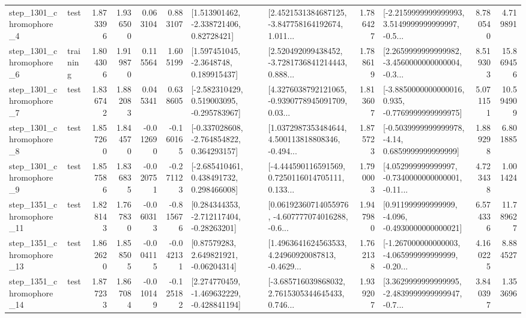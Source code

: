 \begin{tabular}{llrrrrllrlrr}
  step\_1301\_chromophore\_4 &      test &      1.873396 &    1.936500 &      0.063104 &  0.883107 &     [1.513901462, -2.338721406, 0.82728421] &  [2.4521531384687125, -3.847758164192674, 1.011... &       1.786427 &  [-2.2159999999999993, 3.5149999999999997, -0.5... &            8.780540 &          4.719891 \\
  step\_1301\_chromophore\_6 &  training &      1.804306 &    1.919870 &      0.115564 &  1.605199 &      [1.597451045, -2.3648748, 0.189915437] &  [2.520492099438452, -3.7281736841214443, 0.888... &       1.788619 &  [2.2659999999999982, -3.4560000000000004, -0.3... &            8.519303 &         15.869456 \\
  step\_1301\_chromophore\_7 &      test &      1.836742 &    1.882083 &      0.045341 &  0.638605 &   [-2.582310429, 0.519003095, -0.295783967] &  [4.3276038792121065, -0.9390778945091709, 0.03... &       1.813607 &  [-3.8850000000000016, 0.935, -0.7769999999999975] &            5.071151 &         10.594909 \\
  step\_1301\_chromophore\_8 &      test &      1.857260 &    1.844570 &     -0.012690 & -0.160165 &   [-0.337028608, -2.764854822, 0.364293157] &  [1.0372987353484644, 4.500113818808346, -0.494... &       1.875723 &   [-0.5039999999999978, -4.14, 0.6859999999999999] &            1.889298 &          6.801885 \\
  step\_1301\_chromophore\_9 &      test &      1.857586 &    1.836835 &     -0.020751 & -0.271123 &    [-2.685410461, 0.438491732, 0.298466008] &  [-4.444590116591569, 0.7250116014705111, 0.133... &       1.790003 &  [4.052999999999997, -0.7340000000000001, -0.11... &            4.723438 &          1.001424 \\
 step\_1351\_chromophore\_11 &      test &      1.828143 &    1.767830 &     -0.060313 & -0.815676 &    [0.284344353, -2.712117404, -0.28263201] &  [0.06192360714055976, -4.607777074016288, -0.6... &       1.947980 &   [0.911999999999999, -4.096, -0.4930000000000021] &            6.574336 &         11.789627 \\
 step\_1351\_chromophore\_13 &      test &      1.862620 &    1.858505 &     -0.004115 & -0.042131 &      [0.87579283, 2.649821921, -0.06204314] &  [1.4963641624563533, 4.24960920087813, -0.4629... &       1.762138 &  [-1.267000000000003, -4.065999999999999, -0.20... &            4.160225 &          8.884527 \\
 step\_1351\_chromophore\_14 &      test &      1.877233 &    1.867084 &     -0.010149 & -0.125182 &   [2.274770459, -1.469632229, -0.428841194] &  [-3.685716039868032, 2.7615305344645433, 0.746... &       1.939207 &  [3.3629999999999995, -2.4839999999999947, -0.7... &            3.840397 &          1.353696 \\

\end{tabular}
